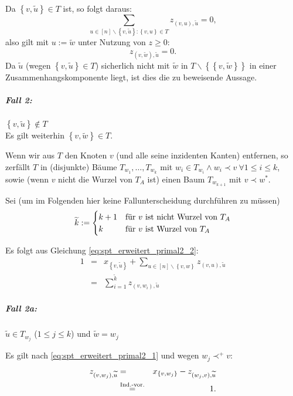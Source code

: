 \documentclass[10p,a4paper,BCOR = 12mm, DIV=15]{scrbook}
\begin{document}
\begin{bew}
Da $\left\{v, \widetilde{u}\right\}\in T$ ist, so folgt daraus:
\begin{displaymath}
\sum_{u\in[n]\backslash\left\{v, \widetilde{u}\right\}: \left\{v, u\right\}\in T} z_{\left(v, u\right), \widetilde{u}} = 0,
\end{displaymath}
also gilt mit $u:=\widetilde{w}$ unter Nutzung von $z\geq 0$:
\begin{displaymath}
z_{\left(v, \widetilde{w}\right), \widetilde{u}} = 0.
\end{displaymath}
Da $\widetilde{u}$ (wegen $\left\{v, \widetilde{u}\right\}\in T$) sicherlich nicht mit $\widetilde{w}$ in $T\backslash \left\{\left\{v, \widetilde{w}\right\}\right\}$ in einer Zusammenhangskomponente liegt, ist dies die zu beweisende Aussage.

\subparagraph{Fall 2:} $\left\{v, \widetilde{u}\right\}\notin T$ \\
Es gilt weiterhin $\left\{v, \widetilde{w}\right\}\in T$.

Wenn wir aus $T$ den Knoten $v$ (und alle seine inzidenten Kanten) entfernen, so zerfällt $T$ in (disjunkte) Bäume $T_{w_1}, \ldots, T_{w_k}$ mit $w_i\in T_{w_i}\wedge w_i\prec v\ \forall 1\leq i \leq k$, sowie (wenn $v$ nicht die Wurzel von $T_A$ ist) einen Baum $T_{w_{k+1}}$ mit $v\prec w^*$.

Sei (um im Folgenden hier keine Fallunterscheidung durchführen zu müssen)
\begin{displaymath}
\widetilde{k} := \begin{cases}
k+1 & \textnormal{für } v \textnormal{ ist nicht Wurzel von } T_A \\
k & \textnormal{für } v \textnormal{ ist Wurzel von } T_A \\
\end{cases}
\end{displaymath}

Es folgt aus Gleichung \eqref{eq:spt_erweitert_primal2_2}:
\begin{eqnarray}
1 & = & x_{\left\{v, \widetilde{u}\right\}} + \sum_{u\in[n]\backslash\left\{v, w\right\}} z_{\left(v, u\right), \widetilde{u}} \nonumber \\
& = & \sum_{i=1}^{\widetilde{k}} z_{\left(v, w_i\right), \widetilde{u}} \label{eq:case2sum}
\end{eqnarray}

\subparagraph{Fall 2a:} $\widetilde{u}\in T_{w_j}$ ($1\leq j \leq k$) und $\widetilde{w} = w_j$

Es gilt nach \eqref{eq:spt_erweitert_primal2_1} und wegen $w_j \prec^+ v$:
\begin{eqnarray}
z_{\left(v, w_j\right), \widetilde{u}} & = & x_{\left\{v, w_j\right\}} - z_{\left(w_j, v\right), \widetilde{u}} \nonumber \\
& \stackrel{\textnormal{Ind.-vor.}}{=} & 1. \label{eq:z_v_w_j_u1}
\end{eqnarray}


\end{bew}
\end{document}
